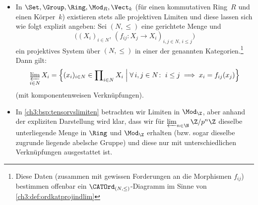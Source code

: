 \begin{thBeispiel}
    \begin{thBemerkung}\hfill
        \begin{itemize}
            \item
                In $\Set,\Group,\Ring,\Mod_R,\Vect_k$ (für einen kommutativen
                Ring~$R$ und einen Körper~$k$) existieren stets alle projektiven
                Limiten und diese lassen sich wie folgt explizit angeben:
                Sei $(N,\leq)$ eine gerichtete Menge und 
                \[ \bigl( (X_i)_{i\in N},
                \, (f_{ij}\colon X_j\to X_i)_{i,j\in N,\, i\leq j} \bigr) \]
                ein
                projektives System über $(N,\leq)$ in einer der genannten
                Kategorien.\footnote{%
                    Diese Daten (zusammen mit gewissen Forderungen an die
                    Morphismen $f_{ij}$) bestimmen offenbar ein
                    $\Ord{(N,\leq)}$-Diagramm im Sinne von
                    \cref{ch3:def:ordkatprojindlim}%
                } Dann gilt:
                \[ \varprojlim_{i\in N} X_i 
                    = \Bigl\{
                        (x_i)_{i\in N} \in \prod\nolimits_{i\in N} X_i
                        \;\Big\vert\; \forall\,i,j\in N\colon\;
                        i \leq j \implies x_i = f_{ij}(x_j)
                    \Bigr\}
                \]
                (mit komponentenweisen Verknüpfungen).
                
            \item
                In \cref{ch3:bsp:tensorvslimiten} betrachten wir Limiten in
                $\Mod_\Z$, aber anhand der expliziten Darstellung wird klar,
                dass wir für $\varprojlim_{n\in\N} \txtZQuot{p^n}$ dieselbe
                unterliegende Menge in $\Ring$ und $\Mod_\Z$ erhalten (bzw.
                sogar dieselbe zugrunde liegende abelsche Gruppe) und diese 
                nur mit unterschiedlichen Verknüpfungen ausgestattet ist.
        \end{itemize}
    \end{thBemerkung}
\end{thBeispiel}

